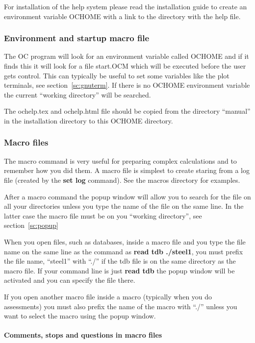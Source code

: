 \documentclass[11pt]{article}
\newcommand{\subsubsubsection}[1]{\paragraph{#1}\mbox{}\\}
\begin{document}
For installation of the help system please read the installation guide
to create an environment variable OCHOME with a link to the directory
with the help file.

\subsubsection{Environment and startup macro file}

The OC program will look for an environment variable called OCHOME and
if it finds this it will look for a file start.OCM which will be
executed before the user gets control.  This can typically be useful
to set some variables like the plot terminals, see
section~\ref{sc:gnuterm}.  If there is no OCHOME environment variable
the current ``working directory'' will be searched.

The ochelp.tex and ochelp.html file should be copied from the
directory ``manual'' in the installation directory to this OCHOME
directory.

\subsubsection{Macro files}\label{sc:macro}

The macro command is very useful for preparing complex calculations
and to remember how you did them.  A macro file is simplest to create
staring from a log file (created by the {\bf set log} command).  See the
macros directory for examples.

After a macro command the popup window will allow you to search for
the file on all your directories unless you type the name of the
file on the same line.  In the latter case the macro file must be
on you ``working directory'', see section~\ref{sc:popup}

When you open files, such as databases, inside a macro file and you
type the file name on the same line as the command as {\bf read tdb
./steel1}, you must prefix the file name, ``steel1'' with ``./'' if
the tdb file is on the same directory as the macro file.  If your
command line is just {\bf read tdb} the popup window will be activated
and you can specify the file there.

If you open another macro file inside a macro (typically when you do
assessments) you must also prefix the name of the macro with ``./''
unless you want to select the macro using the popup window.

\hypertarget{Macro comments}{}
\subsubsubsection{Comments, stops and questions in macro files}\label{sc:macroadd}
\end{document}
